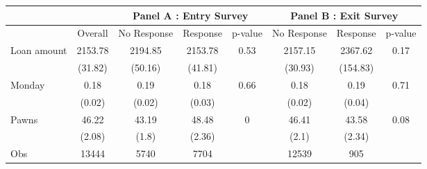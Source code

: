 \begin{tabular}{lcccc|ccc}
\toprule
      &       & \multicolumn{3}{c|}{Panel A : Entry Survey} & \multicolumn{3}{c}{Panel B : Exit Survey} \\
\midrule
\midrule
      & Overall & No Response & Response & p-value & No Response & Response & p-value \\
\midrule
\midrule
Loan amount  & 2153.78 & 2194.85 & 2153.78 & 0.53  & 2157.15 & 2367.62 & 0.17 \\
      & (31.82) & (50.16) & (41.81) &       & (30.93) & (154.83) &  \\
Monday & 0.18  & 0.19  & 0.18  & 0.66  & 0.18  & 0.19  & 0.71 \\
      & (0.02) & (0.02) & (0.03) &       & (0.02) & (0.04) &  \\
Pawns & 46.22 & 43.19 & 48.48 & 0     & 46.41 & 43.58 & 0.08 \\
      & (2.08) & (1.8) & (2.36) &       & (2.1) & (2.34) &  \\
\midrule
Obs   & 13444 & 5740  & 7704  &       & 12539 & 905   &  \\
\bottomrule
\bottomrule
\end{tabular}%
